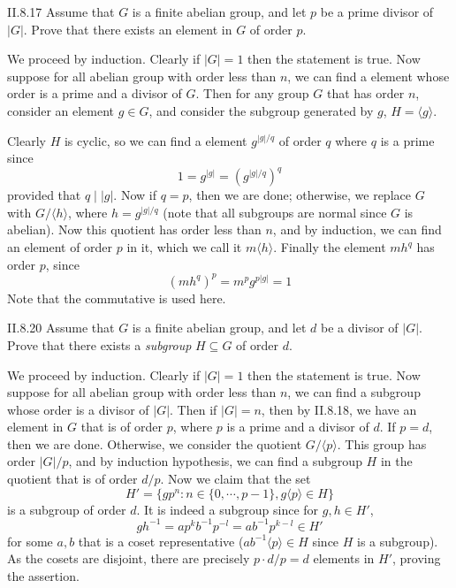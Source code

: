 \begin{problem}{II.8.17}
Assume that $G$ is a finite abelian group, and let $p$ be a prime divisor of $|G|$. Prove that there exists an element in $G$ of order $p$.
\end{problem}
\begin{pf}
We proceed by induction. Clearly if $|G| = 1$ then the statement is true. Now suppose for all abelian group with order less than $n$, we can find a element whose order is a prime and a divisor of $G$. Then for any group $G$ that has order $n$, consider an element $g \in G$, and consider the subgroup generated by $g$, $H = \langle g \rangle$. 

Clearly $H$ is cyclic, so we can find a element $g^{|g|/ q}$ of order $q$ where $q$ is a prime since
\[
1 = g^{|g|} = (g^{|g|/ q})^q
\]
provided that $q\;|\;|g|$. Now if $q = p$, then we are done; otherwise, we replace $G$ with $G/\langle h \rangle$, where $h = g^{|g|/ q}$ (note that all subgroups are normal since $G$ is abelian). Now this quotient has order less than $n$, and by induction, we can find an element of order $p$ in it, which we call it $m\langle h \rangle$. Finally the element $mh^{q}$ has order $p$, since
\[
(mh^{q})^p = m^pg^{p|g|} = 1
\]
Note that the commutative is used here.
\end{pf}

\begin{problem}{II.8.20}
Assume that $G$ is a finite abelian group, and let $d$ be a divisor of $|G|$. Prove that there exists a \textit{subgroup} $H \subseteq G$ of order $d$.
\end{problem}
\begin{pf}
We proceed by induction. Clearly if $|G| = 1$ then the statement is true. Now suppose for all abelian group with order less than $n$, we can find a subgroup whose order is a divisor of $|G|$. Then if $|G| = n$, then by II.8.18, we have an element in $G$ that is of order $p$, where $p$ is a prime and a divisor of $d$. If $p = d$, then we are done. Otherwise, we consider the quotient $G/\langle p \rangle$. This group has order $|G|/p$, and by induction hypothesis, we can find a subgroup $H$ in the quotient that is of order $d/p$. Now we claim that the set
\[
H' = \{ gp^n : n \in \{0, \cdots, p-1\}, g\langle p \rangle \in H \}
\]
is a subgroup of order $d$. It is indeed a subgroup since for $g, h \in H'$,
\[
gh^{-1} = ap^kb^{-1}p^{-l} = ab^{-1}p^{k-l} \in H'
\]
for some $a, b$ that is a coset representative ($ab^{-1}\langle p \rangle \in H$ since $H$ is a subgroup). As the cosets are disjoint, there are precisely $p \cdot d/p = d$ elements in $H'$, proving the assertion.
\end{pf}

